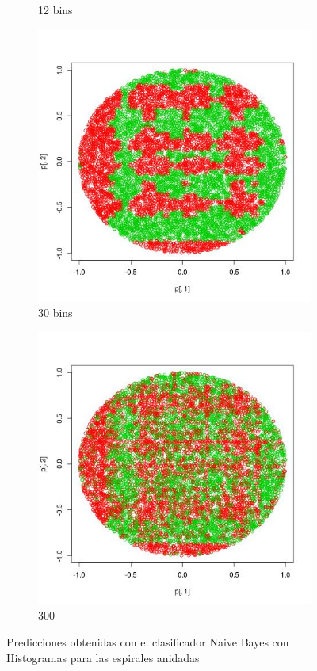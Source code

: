 \documentclass[12pt, a4paper]{article}
\begin{document}
\begin{figure}
\begin{subfigure}[b]{0.40\textwidth}
        \caption{12 bins}
    \end{subfigure}  
    \begin{subfigure}[b]{0.40\textwidth}
        \includegraphics[width=\textwidth]{prediccion10ea}
        \caption{30 bins}
    \end{subfigure}      
        \begin{subfigure}[b]{0.40\textwidth}
        \includegraphics[width=\textwidth]{prediccion15ea}
        \caption{300}
    \end{subfigure}      
    \caption{Predicciones obtenidas con el clasificador Naive Bayes con Histogramas para las espirales anidadas}
\end{figure}
\end{document}
